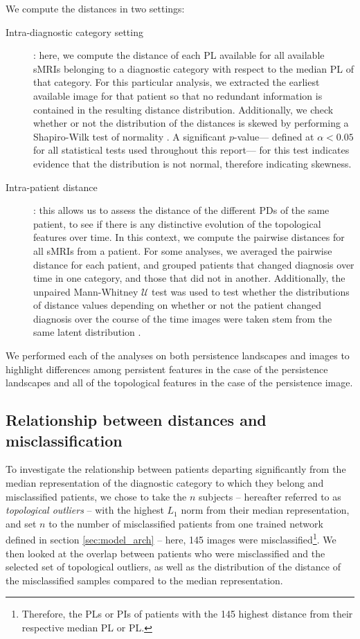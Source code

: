 \documentclass{article}
\begin{document}
We compute the distances in two settings:
\begin{description}
\item[Intra-diagnostic category setting]: here, we compute the distance of each PL available for all
available sMRIs belonging to a diagnostic category with respect to the median PL of that category.
For this particular analysis, we extracted the earliest available image for that patient so that no
redundant information is contained in the resulting distance distribution. Additionally, we check
whether or not the distribution of the distances is skewed by performing a Shapiro-Wilk test of
normality \citep{shapiro1965analysis}. A significant $p$-value--- defined at $\alpha<0.05$ for all
statistical tests used throughout this report--- for this test indicates evidence that the
distribution is not normal, therefore indicating skewness.

\item[Intra-patient distance]: this allows us to assess the distance of the different PDs of the
same patient, to see if there is any distinctive evolution of the topological features over time. In
this context, we compute the pairwise distances for all sMRIs from a patient. For some analyses, we
averaged the pairwise distance for each patient, and grouped patients that changed diagnosis over
time in one category, and those that did not in another. Additionally, the unpaired Mann-Whitney
$\mathcal{U}$ test was used to test whether the distributions of distance values depending on
whether or not the patient changed diagnosis over the course of the time images were taken stem from
the same latent distribution \citep{mann1947test}.
\end{description}

We performed each of the analyses on both persistence landscapes and images to highlight differences
among persistent features in the case of the persistence landscapes and all of the topological
features in the case of the persistence image.

\subsection{Relationship between distances and misclassification}\label{sec:relationship_distance_misclassification}

To investigate the relationship between patients departing significantly from the median
representation of the diagnostic category to which they belong and misclassified patients, we chose
to take the $n$ subjects -- hereafter referred to as \emph{topological outliers} -- with the highest
$L_1$ norm from their median representation, and set $n$ to the number of misclassified patients
from one trained network defined in section \ref{sec:model_arch} -- here, 145 images were
misclassified\footnote{Therefore, the PLs or PIs of patients with the 145 highest distance from
their respective median PL or PL.}. We then looked at the overlap between patients who were
misclassified and the selected set of topological outliers, as well as the distribution of the
distance of the misclassified samples compared to the median representation.
\end{document}
